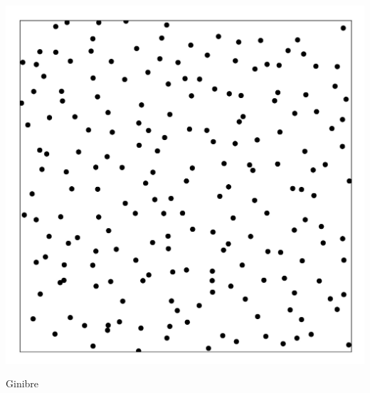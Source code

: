\documentclass[9pt]{beamer}
\begin{document}
\begin{frame}
\begin{center}
    \includegraphics[scale=0.7]{Points trimmed.jpg} 

    Ginibre


\end{center}
\end{frame}
\end{document}
